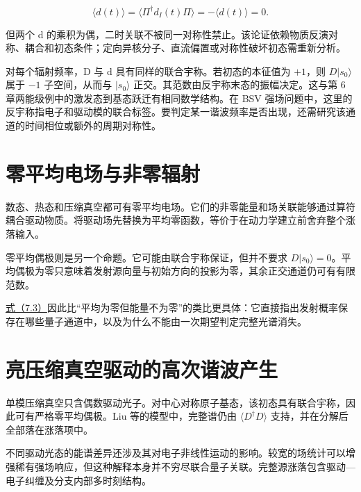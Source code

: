 \documentclass[UTF8,a4paper,zihao=-4,openany,fontset=fandol]{ctexbook}
\begin{document}
\begin{equation*}
\langle d(t)\rangle
=\langle\Pi^\dagger d_I(t)\Pi\rangle
=-\langle d(t)\rangle=0.
\tag{7.5}\label{eq:7.5}
\end{equation*}


但两个 d 的乘积为偶，二时关联不被同一对称性禁止。该论证依赖物质反演对称、耦合和初态条件；定向异核分子、直流偏置或对称性破坏初态需重新分析。



对每个辐射频率，D 与 d 具有同样的联合宇称。若初态的本征值为 $+1$，则 $D|s_0\rangle$ 属于 $-1$ 子空间，从而与 $|s_0\rangle$ 正交。其范数由反宇称末态的振幅决定。这与第 6 章两能级例中的激发态到基态跃迁有相同数学结构。在 BSV 强场问题中，这里的反宇称指电子和驱动模的联合标签。要判定某一谐波频率是否出现，还需研究该通道的时间相位或额外的周期对称性。



\section{零平均电场与非零辐射}\label{sec:07:8}


数态、热态和压缩真空都可有零平均电场。它们的非零能量和场关联能够通过算符耦合驱动物质。将驱动场先替换为平均零函数，等价于在动力学建立前舍弃整个涨落输入。



零平均偶极则是另一个命题。它可能由联合宇称保证，但并不要求 $D|s_0\rangle=0$。平均偶极为零只意味着发射源向量与初始方向的投影为零，其余正交通道仍可有有限范数。



\hyperref[eq:7.3]{式（7.3）}因此比“平均为零但能量不为零”的类比更具体：它直接指出发射概率保存在哪些量子通道中，以及为什么不能由一次期望判定完整光谱消失。



\section{亮压缩真空驱动的高次谐波产生}\label{sec:07:9}


单模压缩真空只含偶数驱动光子。对中心对称原子基态，该初态具有联合宇称，因此可有严格零平均偶极。Liu 等的模型中，完整谱仍由 $\langle D^\dagger D\rangle$ 支持，并在分解后全部落在涨落项中。



不同驱动光态的能谱差异还涉及其对电子非线性运动的影响。较宽的场统计可以增强稀有强场响应，但这种解释本身并不穷尽联合量子关联。完整源涨落包含驱动—电子纠缠及分支内部多时刻结构。
\end{document}
